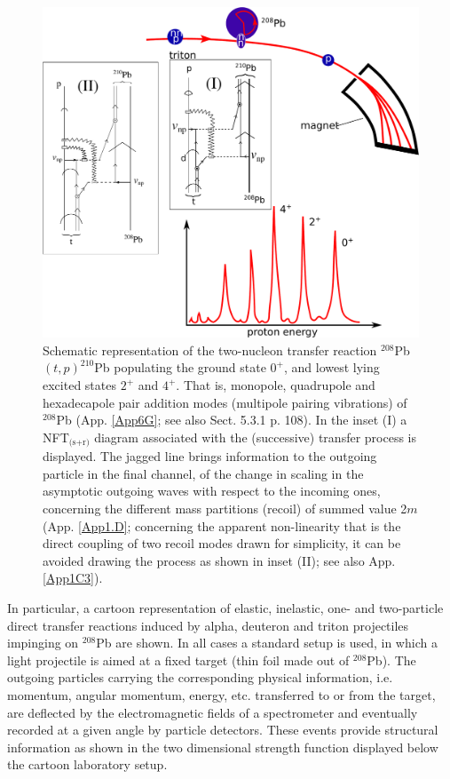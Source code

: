 \begin{figure}
\centerline {
\includegraphics*[width=15cm]{introduccion/figs/figintro3}
}
\caption{Schematic representation of the two-nucleon transfer reaction $^{208}$Pb$(t,p)^{210}$Pb  populating the ground state $0^+$, and lowest lying excited states $2^+$ and $4^+$.  That is, monopole, quadrupole and hexadecapole pair addition modes (multipole pairing vibrations) of $^{208}$Pb   (App. \ref{App6G}; see also \cite{Brink:05} Sect. 5.3.1 p. 108). In the inset (I) a NFT$_{\text{(s+r)}}$ diagram associated with the (successive) transfer process is displayed. The jagged line brings information to the outgoing particle in the final channel, of the change in scaling in the asymptotic outgoing waves with respect to the incoming ones, concerning the different mass partitions (recoil) of summed value 2$m$ (App. \ref{App1.D}; concerning the apparent non-linearity that is the direct coupling of two recoil modes drawn for simplicity, it can be avoided drawing the process as shown in inset (II); see also App. \ref{App1C3}).}
\label{figintro3}
\end{figure}
In particular, a cartoon representation of elastic, inelastic, one- and two-particle direct transfer reactions induced by alpha, deuteron and triton  projectiles impinging on $^{208}$Pb are shown. In all cases a standard setup is used, in which a light projectile is aimed at a fixed target (thin foil made out of $^{208}$Pb). The outgoing particles carrying the corresponding physical information, i.e. momentum, angular momentum, energy, etc. transferred to or from the target, are deflected by the electromagnetic fields of a spectrometer and eventually recorded at a given angle by particle detectors. These events provide structural information as shown in the two dimensional strength function displayed below the cartoon laboratory setup. 

